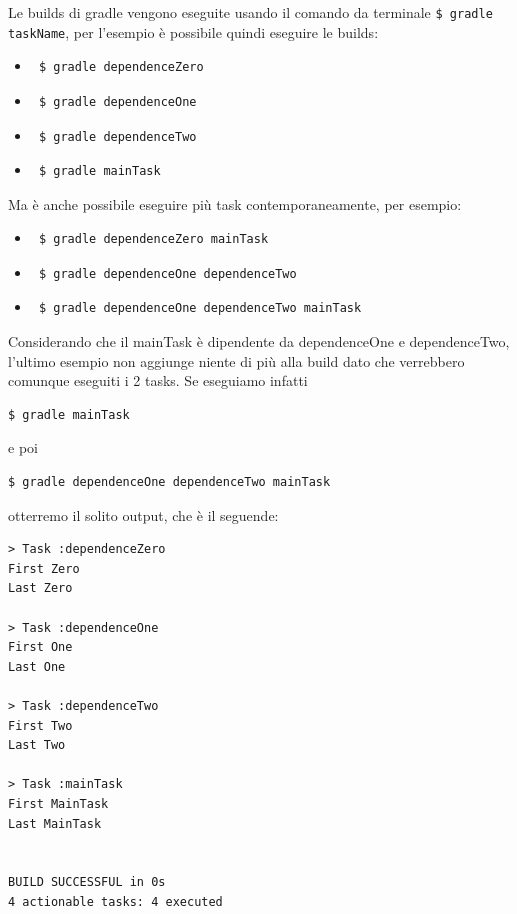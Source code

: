 Le builds di gradle vengono eseguite usando il comando da terminale \texttt{\$ gradle taskName}, per l'esempio è possibile quindi eseguire le builds:
\begin{itemize}
    \item \begin{verbatim} $ gradle dependenceZero \end{verbatim}
    \item \begin{verbatim} $ gradle dependenceOne \end{verbatim}
    \item \begin{verbatim} $ gradle dependenceTwo \end{verbatim}
    \item \begin{verbatim} $ gradle mainTask \end{verbatim}
\end{itemize}
Ma è anche possibile eseguire più task contemporaneamente, per esempio:
\begin{itemize}
    \item \begin{verbatim} $ gradle dependenceZero mainTask\end{verbatim}
    \item \begin{verbatim} $ gradle dependenceOne dependenceTwo \end{verbatim}
    \item \begin{verbatim} $ gradle dependenceOne dependenceTwo mainTask\end{verbatim}
\end{itemize}
Considerando che il mainTask è dipendente da dependenceOne e dependenceTwo, l'ultimo esempio non aggiunge niente di più alla build dato che verrebbero comunque eseguiti i 2 tasks. Se eseguiamo infatti \begin{verbatim}$ gradle mainTask \end{verbatim} e poi \begin{verbatim}$ gradle dependenceOne dependenceTwo mainTask\end{verbatim} otterremo il solito output, che è il seguende:
\label{outMainTask}
\begin{verbatim}
> Task :dependenceZero 
First Zero
Last Zero

> Task :dependenceOne 
First One
Last One

> Task :dependenceTwo 
First Two
Last Two

> Task :mainTask 
First MainTask
Last MainTask


BUILD SUCCESSFUL in 0s
4 actionable tasks: 4 executed\end{verbatim} 
